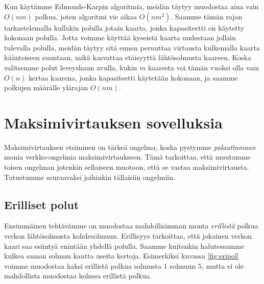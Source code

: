 Kun käytämme Edmonds-Karpin algoritmia,
meidän täytyy muodostaa aina vain $O(nm)$ polkua,
joten algoritmi vie aikaa $O(nm^2)$.
Saamme tämän rajan tarkastelemalla kullakin polulla
jotain kaarta, jonka kapasiteetti on käytetty kokonaan polulla.
Jotta voimme käyttää kyseistä kaarta uudestaan jollain tulevalla polulla,
meidän täytyy sitä ennen peruuttaa virtausta
kulkemalla kaarta käänteiseen suuntaan,
mikä kasvattaa etäisyyttä lähtösolmusta kaareen.
Koska valitsemme polut leveyshaun avulla,
kukin $m$ kaaresta voi tämän vuoksi olla vain $O(n)$ 
kertaa kaarena, jonka kapasiteetti käytetään kokonaan,
ja saamme polkujen määrälle ylärajan $O(nm)$.

\section{Maksimivirtauksen sovelluksia}

Maksimivirtauksen etsiminen on tärkeä ongelma,
koska pystymme \emph{palauttamaan} monia verkko-ongelmia maksimivirtaukseen.
Tämä tarkoittaa, että muutamme toisen ongelman jotenkin
sellaiseen muotoon, että se vastaa maksimivirtausta.
Tutustumme seuraavaksi joihinkin tällaisiin ongelmiin.

\subsection{Erilliset polut}

Ensimmäinen tehtävämme on muodostaa mahdollisimman monta
\emph{erillistä} polkua verkon lähtösolmusta kohdesolmuun.
Erillisyys tarkoittaa, että jokainen verkon kaari saa esiintyä
enintään yhdellä polulla.
Saamme kuitenkin halutessamme kulkea saman solmun kautta useita kertoja.
Esimerkiksi kuvassa \ref{fig:eripol} voimme muodostaa
kaksi erillistä polkua solmusta $1$ solmuun $5$,
mutta ei ole mahdollista muodostaa kolmea erillistä polkua.

